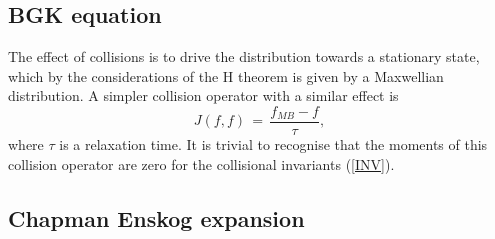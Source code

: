 \subsection{BGK equation}

The effect of collisions is to drive the distribution towards a stationary state, which by the considerations of the H theorem is given by a Maxwellian distribution. A simpler collision operator with a similar effect is
\begin{equation}
  J(f,f) \,=\, \frac{ f_{MB} - f }{\tau},\nonumber
\end{equation}
where $\tau$ is a relaxation time. It is trivial to recognise that the moments of this collision operator are zero for the collisional invariants (\ref{INV}).

\subsection{Chapman Enskog expansion}

